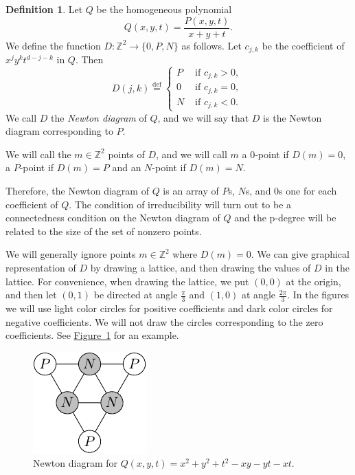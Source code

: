 \documentclass[12pt,openany]{book}
\newcommand{\Z}{{\mathbb{Z}}}
\theoremstyle{plain}
\theoremstyle{remark}
\theoremstyle{definition}
\newtheorem{defn}[thm]{Definition}
\theoremstyle{exercise}
\theoremstyle{example}
\newcommand{\figureref}[1]{\hyperref[#1]{Figure~\ref*{#1}}}
\begin{document}
\begin{defn}
Let $Q$ be the homogeneous polynomial
\begin{equation}
Q(x,y,t) = \frac{P(x,y,t)}{x+y+t} .
\end{equation}
We define the function $D \colon \Z^2 \to \{ 0, P, N \}$ as follows.
Let $c_{j,k}$ be the coefficient of $x^jy^kt^{d-j-k}$ in $Q$.
Then
\begin{equation}
D(j,k) \overset{\text{def}}{=}
\begin{cases}
P & \text{ if $c_{j,k} > 0$, } \\
0 & \text{ if $c_{j,k} = 0$, } \\
N & \text{ if $c_{j,k} < 0$. }
\end{cases}
\end{equation}
We call $D$ the \emph{Newton diagram} of $Q$, and we will say that
$D$ is the Newton diagram corresponding to $P$.

We will call the $m \in \Z^2$ points of $D$, and we will call
$m$ a $0$-point if $D(m)=0$, a $P$-point if $D(m) = P$ and
an $N$-point if $D(m) = N$.
\end{defn}

Therefore, the Newton diagram of $Q$ is an array of $P$s, $N$s, and $0$s
one for each coefficient of $Q$.
The condition of irreducibility will turn out to be a connectedness condition
on the Newton diagram of $Q$ and the p-degree will be related to the
size of the set of nonzero points.

We will generally ignore points $m \in \Z^2$ where $D(m) = 0$.  We can give
graphical representation of $D$ by drawing a lattice, and then
drawing the values of $D$ in the lattice.  For convenience,
when drawing the
lattice, we put $(0,0)$ at the origin, and then let $(0,1)$ be directed
at angle $\frac{\pi}{3}$ and $(1,0)$ at angle $\frac{2\pi}{3}$.
In the figures we will use light color circles for positive
coefficients and dark color circles for negative coefficients.
We will not draw the circles corresponding to the zero
coefficients.
See \figureref{fig:newton} for an example.

\begin{figure}[h!t]
\begin{center}
\includegraphics{diag9}
\caption{Newton diagram for
$Q(x,y,t)=x^2+y^2+t^2
- xy - yt - xt$.\label{fig:newton}}
\end{center}
\end{figure}
\end{document}
